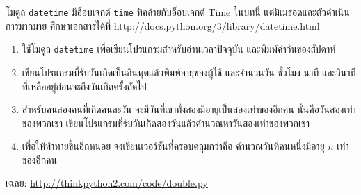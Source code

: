 \begin{exercise}


โมดูล {\tt datetime} มีอ็อบเจกต์  {\tt time} ที่คล้ายกับอ็อบเจกต์ Time ในบทนี้ 
แต่มีเมธอดและตัวดำเนินการมากมาย ศึกษาเอกสารได้ที่ \url{http://docs.python.org/3/library/datetime.html}


\begin{enumerate}

  
\item ใช้โมดูล {\tt datetime} เพื่อเขียนโปรแกรมสำหรับอ่านเวลาปัจจุบัน และพิมพ์ค่าวันของสัปดาห์


\item เขียนโปรแกรมที่รับวันเกิดเป็นอินพุตแล้วพิมพ์อายุของผู้ใช้ และจำนวนวัน ชั่วโมง นาที และวินาทีที่เหลืออยู่ก่อนจะถึงวันเกิดครั้งถัดไป


\item สำหรับคนสองคนที่เกิดคนละวัน จะมีวันที่เขาทั้งสองมีอายุเป็นสองเท่าของอีกคน นั่นคือวันสองเท่าของพวกเขา เขียนโปรแกรมที่รับวันเกิดสองวันแล้วคำนวณหาวันสองเท่าของพวกเขา


\item เพื่อให้ท้าทายขึ้นอีกหน่อย จงเขียนเวอร์ชันที่ครอบคลุมกว่าคือ คำนวณวันที่คนหนึ่งมีอายุ {\scriptsize$n$} เท่าของอีกคน

\end{enumerate}

เฉลย: \url{http://thinkpython2.com/code/double.py}

\end{exercise}




